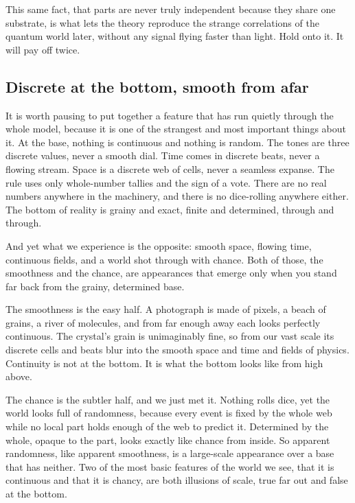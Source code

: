 This same fact, that parts are never truly independent because they share one substrate, is what lets the theory reproduce the strange correlations of the quantum world later, without any signal flying faster than light. Hold onto it. It will pay off twice.

\subsection{Discrete at the bottom, smooth from afar}

It is worth pausing to put together a feature that has run quietly through the whole model, because it is one of the strangest and most important things about it. At the base, nothing is continuous and nothing is random. The tones are three discrete values, never a smooth dial. Time comes in discrete beats, never a flowing stream. Space is a discrete web of cells, never a seamless expanse. The rule uses only whole-number tallies and the sign of a vote. There are no real numbers anywhere in the machinery, and there is no dice-rolling anywhere either. The bottom of reality is grainy and exact, finite and determined, through and through.

And yet what we experience is the opposite: smooth space, flowing time, continuous fields, and a world shot through with chance. Both of those, the smoothness and the chance, are appearances that emerge only when you stand far back from the grainy, determined base.

The smoothness is the easy half. A photograph is made of pixels, a beach of grains, a river of molecules, and from far enough away each looks perfectly continuous. The crystal's grain is unimaginably fine, so from our vast scale its discrete cells and beats blur into the smooth space and time and fields of physics. Continuity is not at the bottom. It is what the bottom looks like from high above.

The chance is the subtler half, and we just met it. Nothing rolls dice, yet the world looks full of randomness, because every event is fixed by the whole web while no local part holds enough of the web to predict it. Determined by the whole, opaque to the part, looks exactly like chance from inside. So apparent randomness, like apparent smoothness, is a large-scale appearance over a base that has neither. Two of the most basic features of the world we see, that it is continuous and that it is chancy, are both illusions of scale, true far out and false at the bottom.

